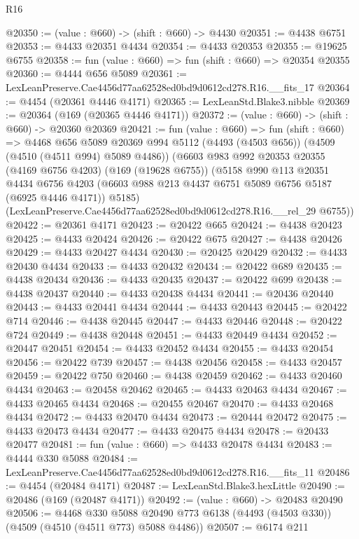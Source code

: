 \begin{lexlean}{R16}
\begin{coremodule}
@20350 := (value : @660) -> (shift : @660) -> @4430
@20351 := @4438 @6751
@20353 := @4433 @20351 @4434
@20354 := @4433 @20353
@20355 := @19625 @6755
@20358 := fun (value : @660) => fun (shift : @660) => @20354 @20355
@20360 := @4444 @656 @5089
@20361 := LexLeanPreserve.Cae4456d77aa62528ed0bd9d0612cd278.R16.__fits_17
@20364 := @4454 (@20361 @4446 @4171)
@20365 := LexLeanStd.Blake3.nibble
@20369 := @20364 (@169 (@20365 @4446 @4171))
@20372 := (value : @660) -> (shift : @660) -> @20360 @20369
@20421 := fun (value : @660) =>
  fun (shift : @660) =>
  @4468
    @656
    @5089
    @20369
    @994
    @5112
    (@4493 (@4503 @656))
    (@4509 (@4510 (@4511 @994) @5089 @4486))
    (@6603
      @983
      @992
      @20353
      @20355
      (@4169 @6756 @4203)
      (@169 (@19628 @6755))
      (@5158
        @990
        @113
        @20351
        @4434
        @6756
        @4203
        (@6603 @988 @213 @4437 @6751 @5089 @6756 @5187 (@6925 @4446 @4171))
        @5185)
      (LexLeanPreserve.Cae4456d77aa62528ed0bd9d0612cd278.R16.__rel_29 @6755))
@20422 := @20361 @4171
@20423 := @20422 @665
@20424 := @4438 @20423
@20425 := @4433 @20424
@20426 := @20422 @675
@20427 := @4438 @20426
@20429 := @4433 @20427 @4434
@20430 := @20425 @20429
@20432 := @4433 @20430 @4434
@20433 := @4433 @20432
@20434 := @20422 @689
@20435 := @4438 @20434
@20436 := @4433 @20435
@20437 := @20422 @699
@20438 := @4438 @20437
@20440 := @4433 @20438 @4434
@20441 := @20436 @20440
@20443 := @4433 @20441 @4434
@20444 := @4433 @20443
@20445 := @20422 @714
@20446 := @4438 @20445
@20447 := @4433 @20446
@20448 := @20422 @724
@20449 := @4438 @20448
@20451 := @4433 @20449 @4434
@20452 := @20447 @20451
@20454 := @4433 @20452 @4434
@20455 := @4433 @20454
@20456 := @20422 @739
@20457 := @4438 @20456
@20458 := @4433 @20457
@20459 := @20422 @750
@20460 := @4438 @20459
@20462 := @4433 @20460 @4434
@20463 := @20458 @20462
@20465 := @4433 @20463 @4434
@20467 := @4433 @20465 @4434
@20468 := @20455 @20467
@20470 := @4433 @20468 @4434
@20472 := @4433 @20470 @4434
@20473 := @20444 @20472
@20475 := @4433 @20473 @4434
@20477 := @4433 @20475 @4434
@20478 := @20433 @20477
@20481 := fun (value : @660) => @4433 @20478 @4434
@20483 := @4444 @330 @5088
@20484 := LexLeanPreserve.Cae4456d77aa62528ed0bd9d0612cd278.R16.__fits_11
@20486 := @4454 (@20484 @4171)
@20487 := LexLeanStd.Blake3.hexLittle
@20490 := @20486 (@169 (@20487 @4171))
@20492 := (value : @660) -> @20483 @20490
@20506 := @4468
    @330
    @5088
    @20490
    @773
    @6138
    (@4493 (@4503 @330))
    (@4509 (@4510 (@4511 @773) @5088 @4486))
@20507 := @6174 @211

\end{coremodule}
\end{lexlean}
